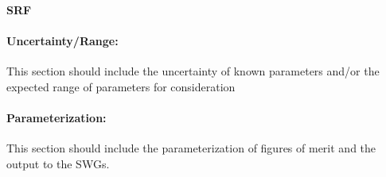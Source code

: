 \textbf{SRF}

\paragraph{Uncertainty/Range:}
This section should include the uncertainty of
known parameters and/or the expected range of parameters for consideration

\paragraph{Parameterization:}
This section should include the parameterization of figures of
merit and the output to the SWGs.

